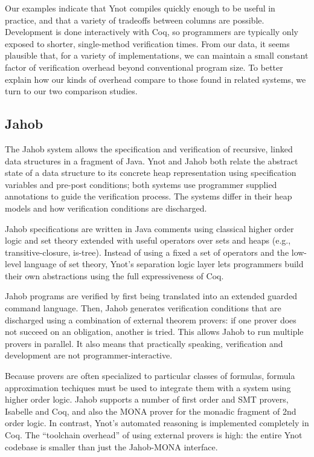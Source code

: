 \documentclass[preprint,nocopyrightspace]{sigplanconf}
\begin{document}
{Our examples indicate that Ynot compiles quickly enough to be useful in practice, and that a variety of tradeoffs between columns are possible.  Development is done interactively with Coq, so programmers are typically only exposed to shorter, single-method verification times.  From our data, it seems plausible that, for a variety of implementations, we can maintain a small constant factor of verification overhead beyond conventional program size.  To better explain how our kinds of overhead compare to those found in related systems, we turn to our two comparison studies.

\subsection{Jahob}

The Jahob system allows the specification and verification 
of recursive, linked data structures in a fragment of Java.  Ynot and Jahob 
both relate the abstract state of a data structure to its concrete heap representation
using specification variables and pre-post conditions; both systems use
programmer supplied annotations to guide the verification process.  The systems 
differ in their heap models and how verification conditions are discharged.

Jahob specifications are written in Java comments using classical higher order
logic and set theory extended with useful operators over sets and heaps (e.g., 
transitive-closure, is-tree).  Instead of using a fixed a set of operators and
the low-level language of set theory, Ynot's separation logic layer lets 
programmers build their own abstractions using the full expressiveness of Coq.  
 
Jahob programs are verified by first being translated into an extended guarded command language.
Then, Jahob generates verification conditions 
 that are discharged using a combination of external theorem provers: if one prover does not succeed 
on an obligation, another is tried.  This allows Jahob to run multiple
provers in parallel.  It also means that practically speaking, verification 
and development are not programmer-interactive.

Because provers are often specialized to particular
classes of formulas, formula approximation techiques must be used to integrate them with
a system using higher order logic. Jahob supports a number of first order and SMT provers,
Isabelle and Coq, and also the MONA prover for the monadic fragment of 2nd order logic.  
In contrast, Ynot's automated reasoning is implemented completely in Coq.  
The ``toolchain overhead'' of using external provers is high: the 
entire Ynot codebase is smaller than just the Jahob-MONA interface.

}
\end{document}
